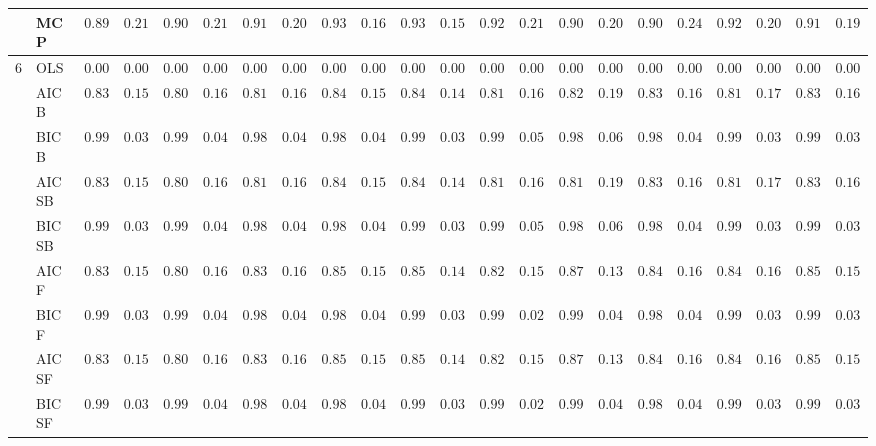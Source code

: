 \begin{tabular}{ll|ll|llllll|llllll|llllll}
	& MCP  & $0.8983$ & $0.2144$ & $0.9083$ & $0.2176$ & $0.9133$ & $0.2017$ & $0.9317$ & $0.1626$ & $0.9350$ & $0.1533$ & $0.9250$ & $0.2137$ & $0.9050$ & $0.2096$ & $0.9000$ & $0.2404$ & $0.9200$ & $0.2044$ & $0.9133$ & $0.1946$ \\\hline
	6 & OLS  & $0.0000$ & $0.0000$ & $0.0000$ & $0.0000$ & $0.0000$ & $0.0000$ & $0.0000$ & $0.0000$ & $0.0000$ & $0.0000$ & $0.0000$ & $0.0000$ & $0.0000$ & $0.0000$ & $0.0000$ & $0.0000$ & $0.0000$ & $0.0000$ & $0.0000$ & $0.0000$ \\
	& AIC B  & $0.8317$ & $0.1526$ & $0.8033$ & $0.1698$ & $0.8167$ & $0.1683$ & $0.8467$ & $0.1583$ & $0.8467$ & $0.1473$ & $0.8100$ & $0.1675$ & $0.8200$ & $0.1934$ & $0.8383$ & $0.1666$ & $0.8183$ & $0.1726$ & $0.8300$ & $0.1624$ \\
	& BIC B  & $0.9917$ & $0.0365$ & $0.9900$ & $0.0463$ & $0.9883$ & $0.0489$ & $0.9867$ & $0.0454$ & $0.9900$ & $0.0398$ & $0.9900$ & $0.0571$ & $0.9850$ & $0.0631$ & $0.9883$ & $0.0489$ & $0.9917$ & $0.0365$ & $0.9917$ & $0.0365$ \\
	& AIC SB  & $0.8317$ & $0.1526$ & $0.8033$ & $0.1698$ & $0.8167$ & $0.1683$ & $0.8467$ & $0.1583$ & $0.8467$ & $0.1473$ & $0.8100$ & $0.1675$ & $0.8183$ & $0.1926$ & $0.8383$ & $0.1666$ & $0.8183$ & $0.1726$ & $0.8300$ & $0.1624$ \\
	& BIC SB  & $0.9917$ & $0.0365$ & $0.9900$ & $0.0463$ & $0.9883$ & $0.0489$ & $0.9867$ & $0.0454$ & $0.9900$ & $0.0398$ & $0.9900$ & $0.0571$ & $0.9850$ & $0.0631$ & $0.9883$ & $0.0489$ & $0.9917$ & $0.0365$ & $0.9917$ & $0.0365$ \\
	& AIC F  & $0.8317$ & $0.1526$ & $0.8033$ & $0.1698$ & $0.8333$ & $0.1658$ & $0.8533$ & $0.1503$ & $0.8500$ & $0.1431$ & $0.8233$ & $0.1514$ & $0.8717$ & $0.1399$ & $0.8417$ & $0.1665$ & $0.8400$ & $0.1640$ & $0.8550$ & $0.1529$ \\
	& BIC F  & $0.9917$ & $0.0365$ & $0.9900$ & $0.0463$ & $0.9883$ & $0.0489$ & $0.9867$ & $0.0454$ & $0.9900$ & $0.0398$ & $0.9950$ & $0.0286$ & $0.9917$ & $0.0435$ & $0.9883$ & $0.0489$ & $0.9917$ & $0.0365$ & $0.9917$ & $0.0365$ \\
	& AIC SF  & $0.8317$ & $0.1526$ & $0.8033$ & $0.1698$ & $0.8333$ & $0.1658$ & $0.8533$ & $0.1503$ & $0.8500$ & $0.1431$ & $0.8233$ & $0.1514$ & $0.8717$ & $0.1399$ & $0.8417$ & $0.1665$ & $0.8400$ & $0.1640$ & $0.8550$ & $0.1529$ \\
	& BIC SF  & $0.9917$ & $0.0365$ & $0.9900$ & $0.0463$ & $0.9883$ & $0.0489$ & $0.9867$ & $0.0454$ & $0.9900$ & $0.0398$ & $0.9950$ & $0.0286$ & $0.9917$ & $0.0435$ & $0.9883$ & $0.0489$ & $0.9917$ & $0.0365$ & $0.9917$ & $0.0365$ \\

\end{tabular}
